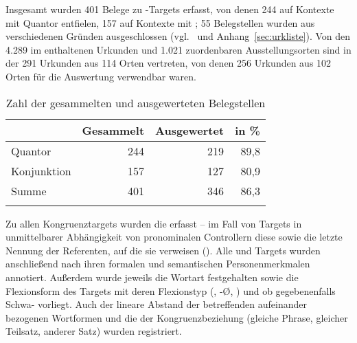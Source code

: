 \label{phsec:caohiatus}

Insgesamt wurden 401 Belege zu -Targets erfasst, von
denen 244 auf Kontexte mit Quantor entfielen, 157 auf Kontexte mit
; 55 Belegstellen wurden aus verschiedenen Gründen
ausgeschlossen (vgl.~ und Anhang~\ref{sec:urkliste}). Von
den 4.289 im \CAO{} enthaltenen Urkunden und 1.021 zuordenbaren
Ausstellungsorten sind in der  291 Urkunden aus 114 Orten
vertreten, von denen 256 Urkunden aus 102 Orten für die Auswertung verwendbar
waren.

\begin{table}
\centering
\caption{Zahl der gesammelten und ausgewerteten Belegstellen}
\begin{tabular}{l r r r}
\lsptoprule

%
	& Gesammelt
	& Ausgewertet
	& in \%
	\\

\midrule


Quantor
	& 244 %
	& 219 %
	& 89,8 %
	\\

Konjunktion
	& 157 %
	& 127 %
	& 80,9 %
	\\

\midrule

Summe
	& 401 %
	& 346 %
	& 86,3 %
	\\

\lspbottomrule
\end{tabular}
\label{tab:ausgewcao}
\end{table}

Zu allen Kongruenztargets wurden die  erfasst -- im
Fall von Targets in unmittelbarer Abhängigkeit von pronominalen
Controllern diese sowie die letzte Nennung der Referenten, auf
die sie verweisen (). Alle 
und Targets wurden anschließend nach ihren formalen
und semantischen Personenmerkmalen
annotiert. Außerdem wurde jeweils die Wortart festgehalten sowie die
Flexionsform des Targets mit deren Flexionstyp (, -Ø,
) und ob gegebenenfalls Schwa- vorliegt. Auch der
lineare Abstand der betreffenden aufeinander bezogenen
Wortformen und die  der Kongruenzbeziehung
(gleiche Phrase, gleicher Teilsatz, anderer Satz) wurden registriert.

